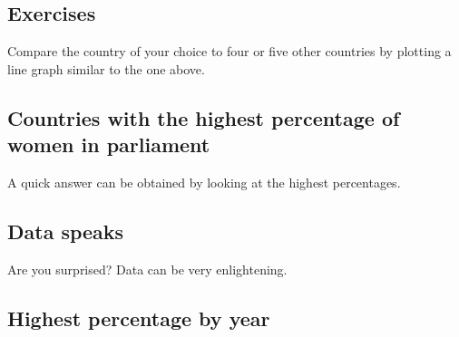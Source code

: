 \documentclass[a4paper,9pt,twocolumn,twoside,printwatermark=false]{pinp}
\begin{document}
\subsection{Exercises}\label{exercises}

Compare the country of your choice to four or five other countries by
plotting a line graph similar to the one above.

\subsection{Countries with the highest percentage of women in
parliament}\label{countries-with-the-highest-percentage-of-women-in-parliament}

A quick answer can be obtained by looking at the highest percentages.

\begin{Shaded}
\end{Shaded}

\subsection{Data speaks}\label{data-speaks}

Are you surprised? Data can be very enlightening.

\subsection{Highest percentage by
year}\label{highest-percentage-by-year}
\end{document}
